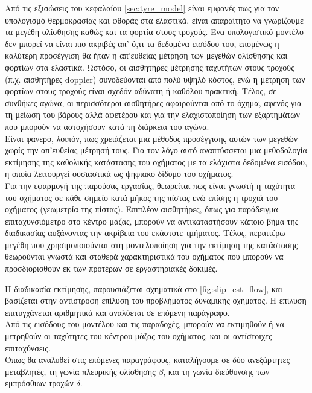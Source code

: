 Από τις εξισώσεις του κεφαλαίου \ref{sec:tyre_model} είναι εμφανές πως για τον υπολογισμό θερμοκρασίας και φθοράς στα ελαστικά,
είναι απαραίτητο να γνωρίζουμε τα μεγέθη ολίσθησης καθώς και τα φορτία στους τροχούς.
Ένα υπολογιστικό μοντέλο δεν μπορεί να είναι πιο ακριβές απ' ό,τι τα δεδομένα εισόδου του, επομένως η καλύτερη προσέγγιση θα ήταν η απ'ευθείας
μέτρηση των μεγεθών ολίσθησης και φορτίων στα ελαστικά. Ωστόσο, οι αισθητήρες μέτρησης ταχυτήτων στους τροχούς (π.χ. αισθητήρες doppler) συνοδεύονται από πολύ υψηλό κόστος, ενώ
η μέτρηση των φορτίων στους τροχούς είναι σχεδόν αδύνατη ή καθόλου πρακτική. Τέλος, σε συνθήκες αγώνα, οι περισσότεροι αισθητήρες αφαιρούνται από το όχημα, αφενός για τη μείωση του βάρους αλλά αφετέρου
και για την ελαχιστοποίηση των εξαρτημάτων που μπορούν να αστοχήσουν κατά τη διάρκεια του αγώνα.\\
\noindent
Είναι φανερό, λοιπόν, πως χρειάζεται μια μέθοδος προσέγγισης αυτών των μεγεθών χωρίς την απ'ευθείας μέτρησή τους. Για τον λόγο αυτό αναπτύσσεται μια μεθοδολογία
εκτίμησης της καθολικής κατάστασης του οχήματος με τα ελάχιστα δεδομένα εισόδου, η οποία λειτουργεί ουσιαστικά ως ψηφιακό δίδυμο του οχήματος.\\[5pt]

Για την εφαρμογή της παρούσας εργασίας, θεωρείται πως είναι γνωστή η ταχύτητα του οχήματος σε κάθε σημείο κατά μήκος της πίστας ενώ επίσης η τροχιά του οχήματος (γεωμετρία της πίστας). Επιπλέον αισθητήρες, όπως για παράδειγμα επιταχυνσιόμετρο στο κέντρο μάζας, μπορούν να αντικαταστήσουν κάποιο βήμα της διαδικασίας αυξάνοντας την ακρίβεια του εκάστοτε τμήματος.
Τέλος, περαιτέρω μεγέθη που χρησιμοποιούνται στη μοντελοποίηση για την εκτίμηση της κατάστασης θεωρούνται γνωστά και σταθερά χαρακτηριστικά του οχήματος που μπορούν να προσδιορισθούν εκ των προτέρων σε εργαστηριακές δοκιμές. 

Η διαδικασία εκτίμησης, παρουσιάζεται σχηματικά στο \cref{fig:slip_est_flow},
και βασίζεται στην αντίστροφη επίλυση του προβλήματος δυναμικής οχήματος. Η επίλυση επιτυγχάνεται αριθμητικά και αναλύεται σε επόμενη παράγραφο.\\
\noindent
Από τις εισόδους του μοντέλου και τις παραδοχές, μπορούν να εκτιμηθούν ή να μετρηθούν οι ταχύτητες του κέντρου μάζας του οχήματος, και οι αντίστοιχες επιταχύνσεις.\\

Όπως θα αναλυθεί στις επόμενες παραγράφους, καταλήγουμε σε δύο ανεξάρτητες μεταβλητές, τη γωνία πλευρικής ολίσθησης $\beta$, και τη γωνία διεύθυνσης των εμπρόσθιων τροχών $\delta$.

